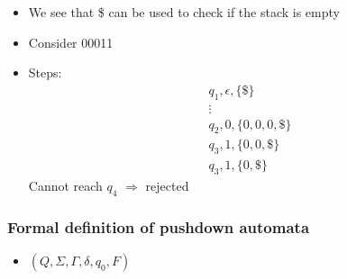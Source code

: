 \begin{frame}[allowframebreaks]
\begin{itemize}
\item We see that \$ can be used to check
  if the stack is empty

\item Consider 00011
\item [] Steps:
  \begin{equation*}
    \begin{split}
& q_1, \epsilon, \{\$\} \\
& \vdots \\
& q_2, 0, \{0, 0,0,\$\}\\
& q_3, 1, \{0, 0, \$\}\\
& q_3, 1, \{0, \$\}
\end{split}
\end{equation*}
Cannot reach $q_4$ $\Rightarrow$ rejected  
\end{itemize}\end{frame} \begin{frame}[allowframebreaks] \frametitle{Formal definition of pushdown automata}
  \begin{itemize}  
\item $(Q,\Sigma, \Gamma, \delta, q_0, F)$


\end{itemize}
\end{frame}
